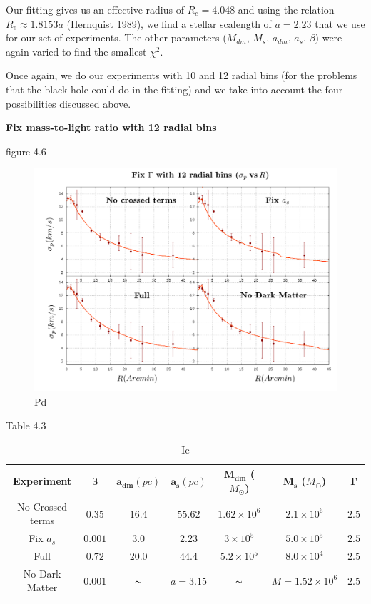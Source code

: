 Our fitting gives us an effective radius of $R_{e}=4.048$ and using the relation $R_{e}\approx1.8153a$ (Hernquist 1989), we find a stellar scalength of $a=2.23$ that we use for our set of experiments. The other parameters ($M_{dm}$, $M_{s}$, $a_{dm}$, $a_{s}$, $\beta$) were again varied to find the smallest $\chi^{2}$.

Once again, we do our experiments with 10 and 12 radial bins (for the problems that the black hole could do in the fitting) and we take into account the four possibilities discussed above.

\textbf{Fix mass-to-light ratio with 12 radial bins}

figure 4.6

\begin{figure}[H]
\centering
\includegraphics[width=15cm]{images/fix_gamma_refinado_12.png}
\caption[Pg]{Pd}
\end{figure}

Table 4.3

\begin{table}[H]
\begin{center}
\begin{tabular}{| c| c| c| c| c| c| c|}
    \hline
    \textbf{Experiment} & $\mathbf{\beta}$ & $\mathbf{a_{dm}} (pc)$ & $\mathbf{a_{s}} (pc)$ & $\mathbf{M_{dm}}$ ($M_{\odot}$) & $\mathbf{M_{s}}$ ($M_{\odot}$) & $\mathbf{\Gamma}$\\ \hline
	No Crossed terms & $0.35$ &	$16.4$ &	$55.62$ &	$1.62 \times 10^{6}$ &	$2.1 \times 10^{6}$ &	$2.5$\\ \hline
	Fix $a_s$ &	$0.001$ &	$3.0$ &	$2.23$ &	$3 \times 10^{5}$ &	$5.0 \times 10 ^{5}$ &	$2.5$\\ \hline
	Full &	$0.72$ &	$20.0$ &	$44.4$ &	$5.2 \times 10^{5}$ &	$8.0 \times 10^{4}$ &	$2.5$\\ \hline
	No Dark Matter &	$0.001$ &	$\thicksim$ & $ a = 3.15$ &	$\thicksim$ & $  M = 1.52 \times 10^{6}$ & 	$2.5$\\
    \hline
  \end{tabular} 
\caption[It]{Ie}
\end{center}
  
\end{table}

